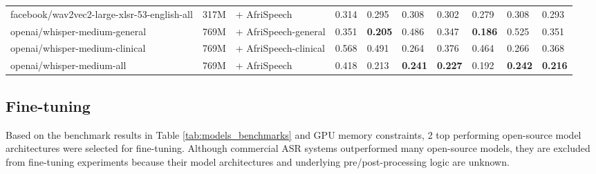 \documentclass[11pt,a4paper]{article}
\begin{document}
\begin{table*}
\begin{tabular}{l|l|p{1.8cm}|p{0.7cm}|l|l|l|l|l|l}
facebook/wav2vec2-large-xlsr-53-english-all  & 317M & + AfriSpeech  &   0.314  &   0.295 &    0.308 &  0.302 &   0.279 &    0.308 &  0.293 \\
openai/whisper-medium-general       & 769M & + AfriSpeech-general  &  0.351          &   \textbf{0.205} &    0.486 &  0.347 &   \textbf{0.186} &    0.525 &  0.351 \\
openai/whisper-medium-clinical        & 769M & + AfriSpeech-clinical  &   0.568         &   0.491 &    0.264 &  0.376 &   0.464 &    0.266 &  0.368 \\
openai/whisper-medium-all       & 769M & + AfriSpeech  &       0.418           &   0.213 &    \textbf{0.241} &  \textbf{0.227} &   0.192 &    \textbf{0.242} &  \textbf{0.216} \\

\bottomrule
\end{tabular}
\caption{Results showing selected models, number of parameters, Number of pre-training/fine-tuning corpora ["Multi" refers to multilingual or multi-task], Librispeech \citep{panayotov2015librispeech} test clean WER and AfriSpeech dev and test set performance for open-source, commercial ASR models, and fine-tuned models (Ours). Missing values indicate incomplete or failed experiments.}
\label{tab:models_benchmarks}
\end{table*}


\subsection{Fine-tuning}
Based on the benchmark results in Table \ref{tab:models_benchmarks} and GPU memory constraints, 2 top performing open-source model architectures were selected for fine-tuning. Although commercial ASR systems outperformed many open-source models, they are excluded from fine-tuning experiments because their model architectures and underlying pre/post-processing logic are unknown. 
\end{document}
